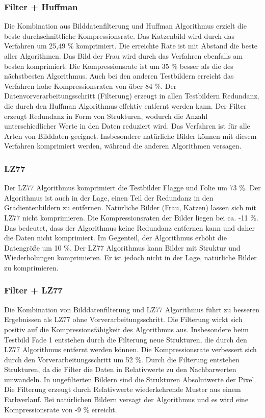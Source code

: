 \documentclass[conference]{IEEEtran}
\begin{document}
\subsubsection{Filter + Huffman}

Die Kombination aus Bilddatenfilterung und Huffman Algorithmus erzielt die
beste durchschnittliche Kompressionsrate.
Das Katzenbild wird durch das Verfahren um 25,49 \% komprimiert.
Die erreichte Rate ist mit Abstand die beste aller Algorithmen.
Das Bild der Frau wird durch das Verfahren ebenfalls am besten komprimiert.
Die Kompressionsrate ist um 35 \% besser als die des nächstbesten Algorithmus.
Auch bei den anderen Testbildern erreicht das Verfahren hohe Kompressionsraten von über 84 \%.
Der Datenvorverarbeitungsschritt (Filterung) erzeugt in allen Testbildern Redundanz, die
durch den Huffman Algorithmus effektiv entfernt werden kann.
Der Filter erzeugt Redundanz in Form von Strukturen, wodurch die Anzahl unterschiedlicher
Werte in den Daten reduziert wird.
Das Verfahren ist für alle Arten von Bilddaten geeignet.
Insbesondere natürliche Bilder können mit diesem Verfahren komprimiert werden, während
die anderen Algorithmen versagen.


\subsubsection{LZ77}

Der LZ77 Algorithmus komprimiert die Testbilder Flagge und Folie um 73 \%.
Der Algorithmus ist auch in der Lage, einen Teil der Redundanz in den Gradientenbildern
zu entfernen.
Natürliche Bilder (Frau, Katzen) lassen sich mit LZ77 nicht komprimieren.
Die Kompressionsraten der Bilder liegen bei ca. -11 \%.
Das bedeutet, dass der Algorithmus keine Redundanz entfernen kann und daher die Daten
nicht komprimiert.
Im Gegenteil, der Algorithmus erhöht die Datengröße um 10 \%.
Der LZ77 Algorithmus kann Bilder mit Struktur und Wiederholungen komprimieren.
Er ist jedoch nicht in der Lage, natürliche Bilder zu komprimieren.

\subsubsection{Filter + LZ77}

Die Kombination von Bilddatenfilterung und LZ77 Algorithmus führt zu besseren
Ergebnissen als LZ77 ohne Vorverarbeitungsschritt.
Die Filterung wirkt sich positiv auf die Kompressionsfähigkeit des Algorithmus aus.
Insbesondere beim Testbild Fade 1 entstehen durch die Filterung neue Strukturen,
die durch den LZ77 Algorithmus entfernt werden können.
Die Kompressionsrate verbessert sich durch den Vorverarbeitungsschritt um 52 \%.
Durch die Filterung entstehen Strukturen, da die Filter die Daten in
Relativwerte zu den Nachbarwerten umwandeln.
In ungefilterten Bildern sind die Strukturen Absolutwerte der Pixel.
Die Filterung erzeugt durch Relativwerte wiederkehrende Muster aus einem Farbverlauf.
Bei natürlichen Bildern versagt der Algorithmus und es wird eine
Kompressionsrate von -9 \% erreicht.
\end{document}
